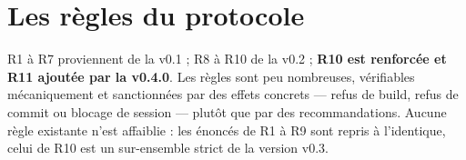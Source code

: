 \section{Les règles du protocole}\label{sec:regles}

R1 à R7 proviennent de la v0.1 ; R8 à R10 de la v0.2 ; \textbf{R10 est renforcée et R11
ajoutée par la v0.4.0}. Les règles sont peu nombreuses, vérifiables mécaniquement et
sanctionnées par des effets concrets — refus de build, refus de commit ou blocage de
session — plutôt que par des recommandations. Aucune règle existante n’est affaiblie : les
énoncés de R1 à R9 sont repris à l’identique, celui de R10 est un sur-ensemble strict de
la version v0.3.

